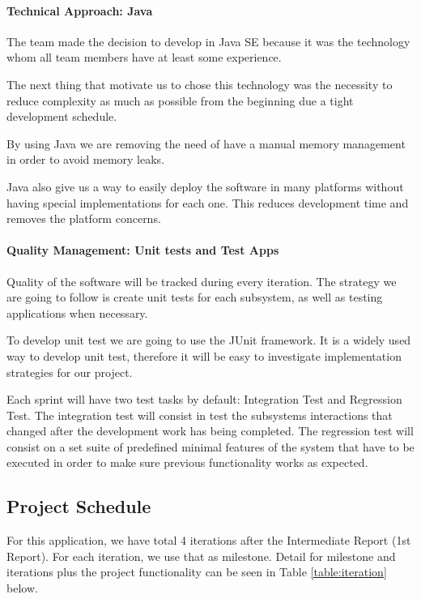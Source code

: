 \documentclass[11pt]{article}
\begin{document}
	\paragraph{Technical Approach: Java} The team made the decision to develop in Java SE because it was the technology whom all team members have at least some experience. 
	
	The next thing that motivate us to chose this technology was the necessity to reduce complexity as much as possible from the beginning due a tight development schedule. 
	
	By using Java we are removing the need of have a manual memory management in order to avoid memory leaks.
	
	Java also give us a way to easily deploy the software in many platforms without having special implementations for each one. This reduces development time and removes the platform concerns.
	
	\paragraph{Quality Management: Unit tests and Test Apps} Quality of the software will be tracked during every iteration. The strategy we are going to follow is create unit tests for each subsystem, as well as testing applications when necessary.  
	
	To develop unit test we are going to use the JUnit framework. It is a widely used way to develop unit test, therefore it will be easy to investigate implementation strategies for our project. 
	
	Each sprint will have two test tasks by default: Integration Test and Regression Test. The integration test will consist in test the subsystems interactions that changed after the development work has being completed. The regression test will consist on a set suite of predefined minimal features of the system that have to be executed in order to make sure previous functionality works as expected.
	
\subsection{Project Schedule}

 For this application, we have total 4 iterations after the Intermediate Report (1st Report). For each iteration, we use that as milestone. Detail for milestone and iterations plus the project functionality can be seen in Table \ref{table:iteration} below.
\end{document}
